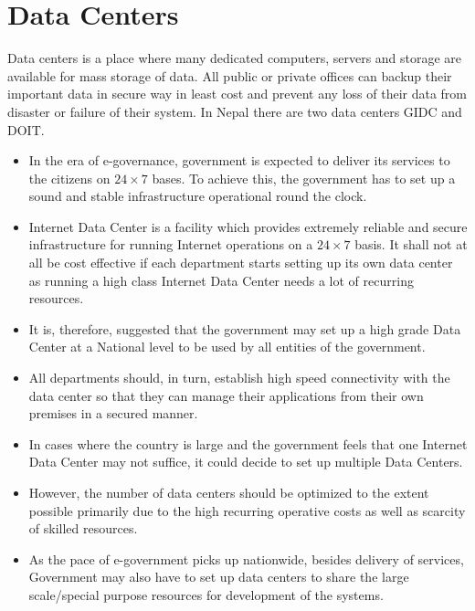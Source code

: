 \section{Data Centers}
Data centers is a place where many dedicated computers, servers and storage are available for mass storage of data. All public or private offices can backup their important data in secure way in least cost and prevent any loss of their data from disaster or failure of their system. In Nepal there are two data centers GIDC and DOIT. 

\begin{itemize}
	\item In the era of e-governance, government is expected to deliver its services to the citizens on $ 24\times7 $ bases. To achieve this, the government has to set up a sound and stable infrastructure operational round the clock.
	
	\item Internet Data Center is a facility which provides extremely reliable and secure infrastructure for running Internet operations on a $ 24\times7 $ basis. It shall not at all be cost effective if each department starts setting up its own data center as running a high class Internet Data Center needs a lot of recurring resources.
	
	\item It is, therefore, suggested that the government may set up a high grade Data Center at a National level to be used by all entities of the government.
	
	\item All departments should, in turn, establish high speed connectivity with the data center so that they can manage their applications from their own premises in a secured manner.
	
	\item In cases where the country is large and the government feels that one Internet Data Center may not suffice, it could decide to set up multiple Data Centers.
	
	\item However, the number of data centers should be optimized to the extent possible primarily due to the high recurring operative costs as well as scarcity of skilled resources.
		
	\item As the pace of e-government picks up nationwide, besides delivery of services, Government may also have to set up data centers to share the large scale/special purpose resources for development of the systems.
\end{itemize}


